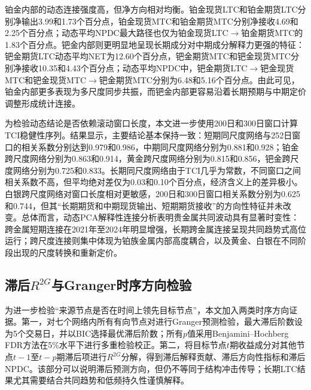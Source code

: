 \documentclass[UTF8,zihao=-4,fontset=fandol]{ctexart}
\begin{document}
铂金内部的动态连接强度高，但净方向相对均衡。铂金现货LTC和铂金期货LTC分别净输出3.99和1.73个百分点，铂金现货MTC和铂金期货MTC分别净接收4.69和2.25个百分点；动态平均NPDC最大路径也仅为铂金现货LTC$\rightarrow$铂金期货MTC的1.83个百分点。钯金内部则更明显地呈现长期成分对中期成分解释力更强的特征：钯金期货LTC动态平均NET为12.60个百分点，钯金期货MTC和钯金现货MTC分别净接收10.35和4.43个百分点；动态平均NPDC中，钯金期货LTC$\rightarrow$钯金现货MTC和钯金现货MTC$\rightarrow$钯金期货MTC分别为6.48和5.16个百分点。由此可见，铂金内部更多表现为多尺度同步共振，而钯金内部更容易沿着长期预期与中期定价调整形成统计连接。

为检验动态结论是否依赖滚动窗口长度，本文进一步使用200日和300日窗口计算TCI稳健性序列。结果显示，主要结论基本保持一致：短期同尺度网络与252日窗口的相关系数分别达到0.979和0.986，中期同尺度网络分别为0.881和0.928；铂金跨尺度网络分别为0.863和0.914，黄金跨尺度网络分别为0.815和0.856，钯金跨尺度网络分别为0.725和0.833。长期同尺度网络由于TCI几乎为常数，不同窗口之间相关系数不高，但平均绝对差仅为0.03和0.10个百分点，经济含义上的差异极小。白银跨尺度网络对窗口长度相对更敏感，200日和300日窗口相关系数分别为0.625和0.744，但其“长期期货和中期现货输出、短期期货接收”的方向性特征并未改变。总体而言，动态PCA解释性连接分析表明贵金属共同波动具有显著时变性：跨金属短期连接在2021年至2024年明显增强，长期跨金属连接呈现共同趋势式高位运行；跨尺度连接则集中体现为铂族金属内部高度耦合，以及黄金、白银在不同阶段出现的尺度转换和重新定价。

\subsection{滞后\texorpdfstring{$R^{2G}$}{R2G}与Granger时序方向检验}

为进一步检验“来源节点是否在时间上领先目标节点”，本文加入两类时序方向证据。第一，对七个网络内所有有向节点对进行Granger预测检验，最大滞后阶数设为5个交易日，并以BIC选择最优滞后阶数；所有$p$值采用Benjamini--Hochberg FDR方法在5\%水平下进行多重检验校正。第二，将目标节点$t$期收益成分对其他节点$t-1$至$t-p$期滞后项进行$R^{2G}$分解，得到滞后解释贡献、滞后方向性指标和滞后NPDC。该部分可以说明滞后预测方向，但仍不等同于结构冲击传导；长期LTC结果尤其需要结合共同趋势和低频持久性谨慎解释。
\end{document}
